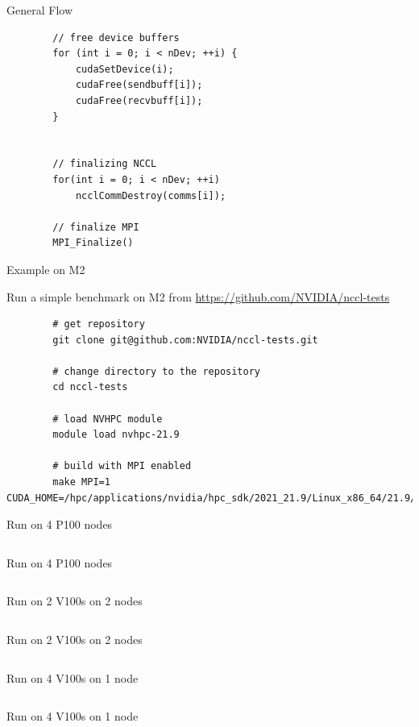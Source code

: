 \begin{frame}[fragile]{General Flow}
	
	\begin{verbatim}
		// free device buffers
		for (int i = 0; i < nDev; ++i) {
			cudaSetDevice(i);
			cudaFree(sendbuff[i]);
			cudaFree(recvbuff[i]);
		}
		
		
		// finalizing NCCL
		for(int i = 0; i < nDev; ++i)
			ncclCommDestroy(comms[i]);
			
		// finalize MPI
		MPI_Finalize()
	\end{verbatim}
\end{frame}

\begin{frame}[fragile]{Example on M2}
	
	Run a simple benchmark on M2 from \url{https://github.com/NVIDIA/nccl-tests}
	
	\begin{verbatim}
		# get repository
		git clone git@github.com:NVIDIA/nccl-tests.git
		
		# change directory to the repository
		cd nccl-tests
		
		# load NVHPC module
		module load nvhpc-21.9
		
		# build with MPI enabled
		make MPI=1 CUDA_HOME=/hpc/applications/nvidia/hpc_sdk/2021_21.9/Linux_x86_64/21.9/cuda/11.4/
	\end{verbatim}
\end{frame}

\begin{frame}[fragile]{Run on 4 P100 nodes }
	\inputminted[fontsize=\tiny]{sh}{examples/nccl/p100x4.sbatch}
\end{frame}

\begin{frame}[fragile]{Run on 4 P100 nodes }
	\inputminted[fontsize=\tiny]{sh}{examples/nccl/p100x4.txt}
\end{frame}

\begin{frame}[fragile]{Run on 2 V100s on 2 nodes }
	\inputminted{sh}{examples/nccl/v100_2x2.sbatch}
\end{frame}

\begin{frame}[fragile]{Run on 2 V100s on 2 nodes}
	\inputminted[fontsize=\tiny]{sh}{examples/nccl/v100_2x2.txt}
\end{frame}

\begin{frame}[fragile]{Run on 4 V100s on 1 node }
	\inputminted{sh}{examples/nccl/v100_4x1.sbatch}
\end{frame}

\begin{frame}[fragile]{Run on 4 V100s on 1 node}
	\inputminted[fontsize=\tiny]{sh}{examples/nccl/v100_4x1.txt}
\end{frame}

